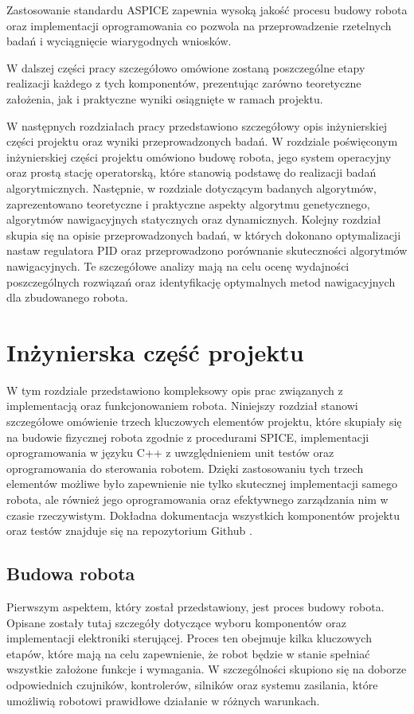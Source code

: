\documentclass[12pt,twoside]{article}
\begin{document}
Zastosowanie standardu ASPICE \cite{SPICE} zapewnia wysoką jakość procesu budowy robota oraz implementacji oprogramowania co pozwola na przeprowadzenie rzetelnych badań i wyciągnięcie wiarygodnych wniosków.

W dalszej części pracy szczegółowo omówione zostaną poszczególne etapy realizacji każdego z tych komponentów, prezentując zarówno teoretyczne założenia, jak i praktyczne wyniki osiągnięte w ramach projektu.

W następnych rozdziałach pracy przedstawiono szczegółowy opis inżynierskiej części projektu oraz wyniki przeprowadzonych badań. W rozdziale poświęconym inżynierskiej części projektu omówiono budowę robota, jego system operacyjny oraz prostą stację operatorską, które stanowią podstawę do realizacji badań algorytmicznych. Następnie, w rozdziale dotyczącym badanych algorytmów, zaprezentowano teoretyczne i praktyczne aspekty algorytmu genetycznego, algorytmów nawigacyjnych statycznych oraz dynamicznych. Kolejny rozdział skupia się na opisie przeprowadzonych badań, w których dokonano optymalizacji nastaw regulatora PID oraz przeprowadzono porównanie skuteczności algorytmów nawigacyjnych. Te szczegółowe analizy mają na celu ocenę wydajności poszczególnych rozwiązań oraz identyfikację optymalnych metod nawigacyjnych dla zbudowanego robota.

\section{Inżynierska część projektu}

W tym rozdziale przedstawiono kompleksowy opis prac związanych z implementacją oraz funkcjonowaniem robota. Niniejszy rozdział stanowi szczegółowe omówienie trzech kluczowych elementów projektu, które skupiały się na budowie fizycznej robota zgodnie z procedurami SPICE, implementacji oprogramowania w języku C++ z uwzględnieniem unit testów oraz oprogramowania do sterowania robotem. Dzięki zastosowaniu tych trzech elementów możliwe było zapewnienie nie tylko skutecznej implementacji samego robota, ale również jego oprogramowania oraz efektywnego zarządzania nim w czasie rzeczywistym.
Dokładna dokumentacja wszystkich komponentów projektu oraz testów znajduje się na repozytorium Github \cite{repo}.

\subsection{Budowa robota}

Pierwszym aspektem, który został przedstawiony, jest proces budowy robota. Opisane zostały tutaj szczegóły dotyczące wyboru komponentów oraz implementacji elektroniki sterującej. Proces ten obejmuje kilka kluczowych etapów, które mają na celu zapewnienie, że robot będzie w stanie spełniać wszystkie założone funkcje i wymagania. W szczególności skupiono się na doborze odpowiednich czujników, kontrolerów, silników oraz systemu zasilania, które umożliwią robotowi prawidłowe działanie w różnych warunkach.
\end{document}
